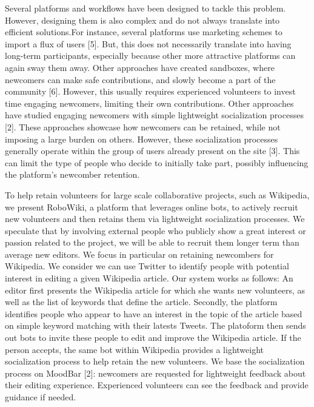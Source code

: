 \documentclass{sigchi}
\begin{document}
Several platforms and workflows have been designed to tackle this problem. However, designing them is also complex and do not always translate into efficient solutions.For instance, several platforms use marketing schemes to import a flux of users [5]. But, this does not necessarily translate into having long-term participants, especially because other more attractive platforms can again sway them away. Other approaches have created sandboxes, where newcomers can make safe contributions, and slowly become a part of the community [6]. However, this usually requires experienced volunteers to invest time engaging newcomers, limiting their own contributions. 
Other approaches have studied engaging newcomers with simple lightweight socialization processes [2]. These approaches showcase how newcomers can be retained, while not imposing a large burden on others. However, these socialization processes generally operate within the group of users already present on the site [3]. This can limit the type of people who decide to initially take part, possibly influencing the platform's newcomber retention.


To help retain volunteers for large scale collaborative projects, such as Wikipedia, we present RoboWiki, a platform that leverages online bots, to actively recruit  new volunteers and then retains them via lightweight socialization processes. We speculate that by involving external people who publicly show a great interest or passion related to the project, we will be able to recruit them longer term than average new editors. We focus in particular on retaining newcombers for Wikipedia. We consider we can use Twitter to identify people with potential interest in editing a given Wikipedia article.  
Our system works as follows: An editor first presents the Wikipedia article for which she wants new volunteers, as well as the list of keywords that define the article. Secondly, the platform identifies people who appear to have an interest in the topic of the article based on simple keyword matching with their latests Tweets. The platoform then sends out bots to invite these people to edit and improve the Wikipedia article. If the person accepts, the same bot within Wikipedia provides a lightweight socialization process to help retain the new volunteers. We base the socialization process on MoodBar [2]: newcomers  are requested for lightweight feedback about their editing experience. Experienced volunteers can see the feedback and provide guidance if needed. 
\end{document}

